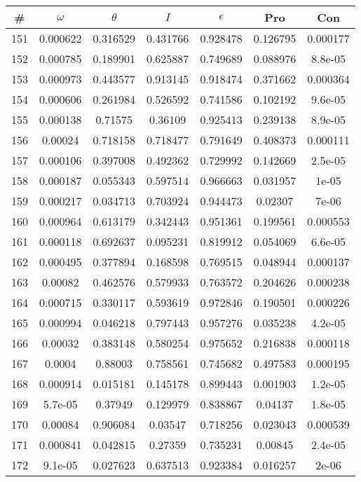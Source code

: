 \newpage
\begin{table}
\begin{tabular}{c|c|c|c|c|c|c}
\# & $\omega$ & $\theta$ & $I$ & $\epsilon$ & Pro & Con\\
\hline
151 & 0.000622 & 0.316529 & 0.431766 & 0.928478 & 0.126795 & 0.000177\\
152 & 0.000785 & 0.189901 & 0.625887 & 0.749689 & 0.088976 & 8.8e-05\\
153 & 0.000973 & 0.443577 & 0.913145 & 0.918474 & 0.371662 & 0.000364\\
154 & 0.000606 & 0.261984 & 0.526592 & 0.741586 & 0.102192 & 9.6e-05\\
155 & 0.000138 & 0.71575 & 0.36109 & 0.925413 & 0.239138 & 8.9e-05\\
156 & 0.00024 & 0.718158 & 0.718477 & 0.791649 & 0.408373 & 0.000111\\
157 & 0.000106 & 0.397008 & 0.492362 & 0.729992 & 0.142669 & 2.5e-05\\
158 & 0.000187 & 0.055343 & 0.597514 & 0.966663 & 0.031957 & 1e-05\\
159 & 0.000217 & 0.034713 & 0.703924 & 0.944473 & 0.02307 & 7e-06\\
160 & 0.000964 & 0.613179 & 0.342443 & 0.951361 & 0.199561 & 0.000553\\
161 & 0.000118 & 0.692637 & 0.095231 & 0.819912 & 0.054069 & 6.6e-05\\
162 & 0.000495 & 0.377894 & 0.168598 & 0.769515 & 0.048944 & 0.000137\\
163 & 0.00082 & 0.462576 & 0.579933 & 0.763572 & 0.204626 & 0.000238\\
164 & 0.000715 & 0.330117 & 0.593619 & 0.972846 & 0.190501 & 0.000226\\
165 & 0.000994 & 0.046218 & 0.797443 & 0.957276 & 0.035238 & 4.2e-05\\
166 & 0.00032 & 0.383148 & 0.580254 & 0.975652 & 0.216838 & 0.000118\\
167 & 0.0004 & 0.88003 & 0.758561 & 0.745682 & 0.497583 & 0.000195\\
168 & 0.000914 & 0.015181 & 0.145178 & 0.899443 & 0.001903 & 1.2e-05\\
169 & 5.7e-05 & 0.37949 & 0.129979 & 0.838867 & 0.04137 & 1.8e-05\\
170 & 0.00084 & 0.906084 & 0.03547 & 0.718256 & 0.023043 & 0.000539\\
171 & 0.000841 & 0.042815 & 0.27359 & 0.735231 & 0.00845 & 2.4e-05\\
172 & 9.1e-05 & 0.027623 & 0.637513 & 0.923384 & 0.016257 & 2e-06\\

\end{tabular}
\end{table}
